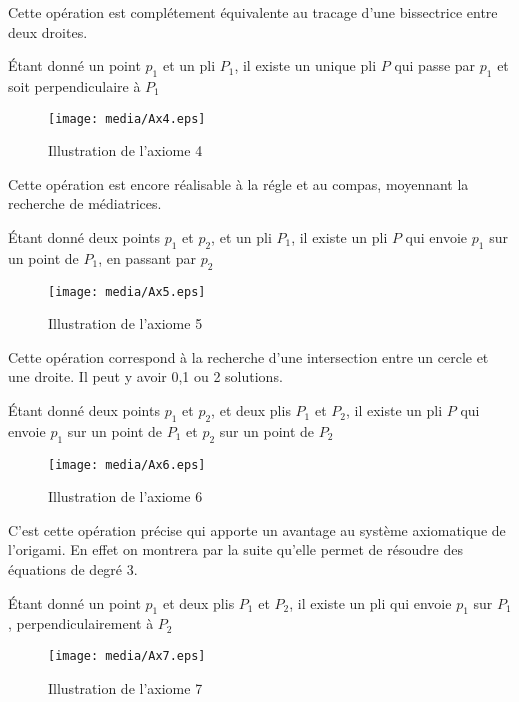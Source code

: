 \documentclass[a4paper,12pt,french]{report}
\begin{document}
		Cette opération est complétement équivalente au tracage d'une bissectrice entre deux droites.
		\begin{axiome}[4]
			Étant donné un point $p_{1}$ et un pli $P_{1}$, il existe un unique pli $P$ qui passe par $p_{1}$ et soit perpendiculaire à $P_{1}$
		\end{axiome}
		
		\begin{figure}
		    \begin{center}
			\texttt{[image: media/Ax4.eps]}
		    \end{center}
			\caption{Illustration de l'axiome 4}
		\end{figure}
		Cette opération est encore réalisable à la régle et au compas, moyennant la recherche de médiatrices.
		\begin{axiome}[5]
			Étant donné deux points $p_{1}$ et $p_{2}$, et un pli $P_{1}$, il existe un pli $P$ qui envoie $p_{1}$ sur un point de $P_{1}$, en passant par $p_{2}$
		\end{axiome}
		\begin{figure}
		    \begin{center}
			\texttt{[image: media/Ax5.eps]}
		    \end{center}
			\caption{Illustration de l'axiome 5}
		\end{figure}
		Cette opération correspond à la recherche d'une intersection entre un cercle et une droite. Il peut y avoir 0,1 ou 2 solutions.
		
		
		\begin{axiome}[6]
			Étant donné deux points $p_{1}$ et $p_{2}$, et deux plis $P_{1}$ et $P_{2}$, il existe un pli $P$ qui envoie $p_{1}$ sur un point de $P_{1}$ et $p_{2}$ sur un point de $P_{2}$
		\end{axiome}
		\begin{figure}
		    \begin{center}
			\texttt{[image: media/Ax6.eps]}
		    \end{center}
			\caption{Illustration de l'axiome 6}
		\end{figure}
		 C'est cette opération précise qui apporte un avantage au système axiomatique de l'origami. En effet on montrera par la suite qu'elle permet de résoudre des équations de degré 3.
		
		
		\begin{axiome}[7]
			Étant donné un point $p_{1}$ et deux plis $P_{1}$ et $P_{2}$, il existe un pli qui envoie $p_{1}$ sur $P_{1}$, perpendiculairement à $P_{2}$
		\end{axiome}
		\begin{figure}
		    \begin{center}
			\texttt{[image: media/Ax7.eps]}
		    \end{center}
			\caption{Illustration de l'axiome 7}
		\end{figure}
		
\end{document}
